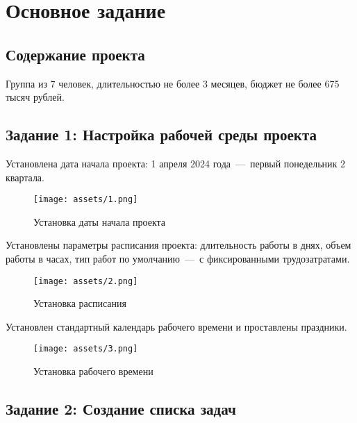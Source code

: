 \chapter{Основное задание}

\section{Содержание проекта}

Группа из 7 человек, длительностью не более 3 месяцев, бюджет не более 675 тысяч рублей.

\section{Задание 1: Настройка рабочей среды проекта}

Установлена дата начала проекта: 1 апреля 2024 года~---~первый понедельник 2 квартала.

\begin{figure}[H]
    \begin{center}
    \texttt{[image: assets/1.png]}
    \caption{Установка даты начала проекта}
    \label{fig:1}
    \end{center}
\end{figure}

Установлены параметры расписания проекта: длительность работы в днях, объем работы в часах, тип работ по умолчанию~---~с фиксированными трудозатратами.

\begin{figure}[H]
    \begin{center}
    \texttt{[image: assets/2.png]}
    \caption{Установка расписания}
    \label{fig:2}
    \end{center}
\end{figure}

Установлен стандартный календарь рабочего времени и проставлены праздники.

\begin{figure}[H]
    \begin{center}
    \texttt{[image: assets/3.png]}
    \caption{Установка рабочего времени}
    \label{fig:3}
    \end{center}
\end{figure}

\section{Задание 2: Создание списка задач}

